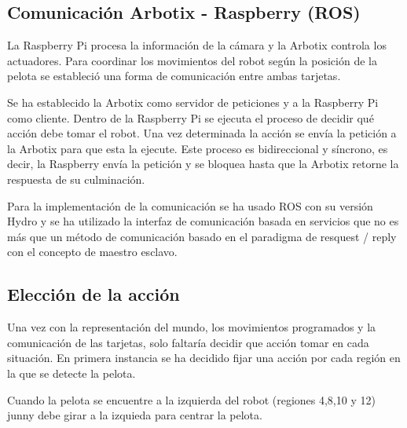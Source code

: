 \subsection{Comunicación Arbotix - Raspberry (ROS)}\label{comunicacion}

La Raspberry Pi procesa la información de la cámara y la Arbotix controla los actuadores. Para coordinar los movimientos del robot según la posición de la pelota se estableció una forma de comunicación entre ambas tarjetas. 

Se ha establecido la Arbotix como servidor de peticiones y a la Raspberry Pi como cliente. Dentro de la Raspberry Pi se ejecuta el proceso de decidir qué acción debe tomar el robot. Una vez determinada la acción se envía la petición a la Arbotix para que esta la ejecute. Este proceso es bidireccional y síncrono, es decir, la Raspberry envía la petición y se bloquea hasta que la Arbotix retorne la respuesta de su culminación.  

Para la implementación de la comunicación se ha usado \gls{ROS} con su versión Hydro y se ha utilizado la interfaz de comunicación basada en servicios que no es más que un método de comunicación basado en el paradigma de resquest / reply con el concepto de maestro esclavo.

\subsection{Elecci\'on de la acci\'on}\label{eleccionAccionesFijas}

Una vez con la representaci\'on del mundo, los movimientos programados y la comunicaci\'on de las tarjetas, solo faltaría decidir que acci\'on tomar en cada situación. En primera instancia se ha decidido fijar una acción por cada región en la que se detecte la pelota. 

Cuando la pelota se encuentre a la izquierda del robot (regiones 4,8,10 y 12) junny debe girar a la izquieda para centrar la pelota.

